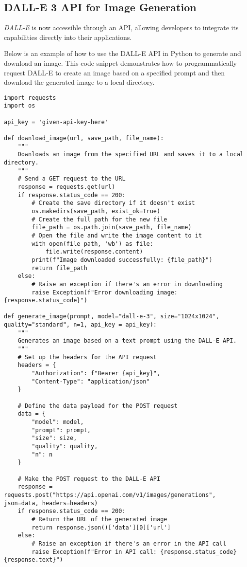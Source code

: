 \subsection{DALL-E 3 API for Image Generation}

\textit{DALL-E} is now accessible through an API, allowing developers to integrate its capabilities directly into their applications.

Below is an example of how to use the DALL-E API in Python to generate and download an image. This code snippet demonstrates how to programmatically request DALL-E to create an image based on a specified prompt and then download the generated image to a local directory.


\begin{lstlisting}
import requests
import os

api_key = 'given-api-key-here'

def download_image(url, save_path, file_name):
    """
    Downloads an image from the specified URL and saves it to a local directory.
    """
    # Send a GET request to the URL
    response = requests.get(url)
    if response.status_code == 200:
        # Create the save directory if it doesn't exist
        os.makedirs(save_path, exist_ok=True)
        # Create the full path for the new file
        file_path = os.path.join(save_path, file_name)
        # Open the file and write the image content to it
        with open(file_path, 'wb') as file:
            file.write(response.content)
        print(f"Image downloaded successfully: {file_path}")
        return file_path
    else:
        # Raise an exception if there's an error in downloading
        raise Exception(f"Error downloading image: {response.status_code}")

def generate_image(prompt, model="dall-e-3", size="1024x1024", quality="standard", n=1, api_key = api_key):
    """
    Generates an image based on a text prompt using the DALL-E API.
    """
    # Set up the headers for the API request
    headers = {
        "Authorization": f"Bearer {api_key}",
        "Content-Type": "application/json"
    }

    # Define the data payload for the POST request
    data = {
        "model": model,
        "prompt": prompt,
        "size": size,
        "quality": quality,
        "n": n
    }

    # Make the POST request to the DALL-E API
    response = requests.post("https://api.openai.com/v1/images/generations", json=data, headers=headers)
    if response.status_code == 200:
        # Return the URL of the generated image
        return response.json()['data'][0]['url']
    else:
        # Raise an exception if there's an error in the API call
        raise Exception(f"Error in API call: {response.status_code} {response.text}")


\end{lstlisting}
